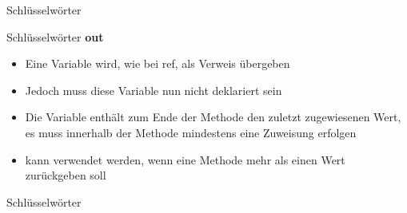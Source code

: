 \begin{frame}{Schlüsselwörter}
	
	
\end{frame}

\begin{frame}{Schlüsselwörter}
	\textbf{out}\\
	\begin{itemize}
		\item Eine Variable wird, wie bei \alert{ref}, als Verweis übergeben
		\item Jedoch muss diese Variable nun nicht deklariert sein
		\item Die Variable enthält zum Ende der Methode den zuletzt zugewiesenen Wert, es muss innerhalb der Methode mindestens eine Zuweisung erfolgen
		\item kann verwendet werden, wenn eine Methode mehr als einen Wert zurückgeben soll
	\end{itemize}
\end{frame}

\begin{frame}{Schlüsselwörter}
	
	
\end{frame}


